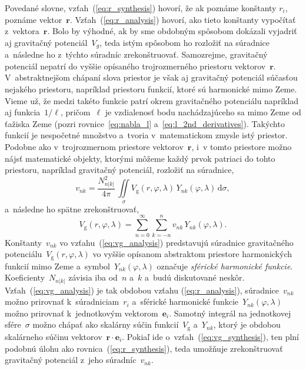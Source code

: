 \documentclass[a4paper, 12pt]{book}
\newcommand{\diff}{\mathrm d}
\newcommand{\gidx}{\mathrm g}
\let\vec\mathbf
\begin{document}
Povedané slovne, vzťah~(\ref{eq:r_synthesis}) hovorí, že ak poznáme konštanty 
$r_i$, poznáme vektor~$\vec r$.  Vzťah~(\ref{eq:r_analysis}) hovorí, ako tieto 
konštanty vypočítať z~vektora~$\vec r$.  Bolo by výhodné, ak by sme obdobným 
spôsobom dokázali vyjadriť aj gravitačný potenciál~$V_g$, teda istým spôsobom 
ho rozložiť na súradnice a~následne ho z~týchto súradníc zrekonštruovať.  
Samozrejme, gravitačný potenciál nepatrí do vyššie opísaného trojrozmerného 
priestoru vektorov~$\vec r$.  V~abstraktnejšom chápaní slova priestor je však 
aj gravitačný potenciál súčasťou nejakého priestoru, napríklad priestoru 
funkcií, ktoré sú harmonické mimo Zeme.  Vieme už, že medzi takéto funkcie 
patrí okrem gravitačného potenciálu napríklad aj funkcia~$1 \slash \ell$, 
pričom~$\ell$ je vzdialenosť bodu nachádzajúceho sa mimo Zeme od ťažiska Zeme 
(pozri rovnice~\ref{eq:nabla_l} a~\ref{eq:l_2nd_derivatives}).  Takýchto 
funkcií je nespočetné množstvo a~tvoria v~matematickom zmysle istý priestor.  
Podobne ako v~trojrozmernom priestore vektorov~$\vec r$, i~v tomto priestore 
možno nájsť matematické objekty, ktorými môžeme každý prvok patriaci do tohto 
priestoru, napríklad gravitačný potenciál, rozložiť na súradnice,
%
\begin{equation}
\label{eq:vg_analysis}
v_{nk} = \frac{N^2_{n|k|}}{4\pi} \, \iint\limits_{\sigma} V_\gidx(r, \varphi, 
\lambda) \, Y_{nk}(\varphi, \lambda) \, \diff \sigma{,}
\end{equation}
%
a~následne ho spätne zrekonštruovať,
%
\begin{equation}
\label{eq:vg_synthesis}
V_\gidx(r, \varphi, \lambda) = \sum_{n = 0}^{\infty} \sum_{k = -n}^{n} v_{nk}
\, Y_{nk}(\varphi, \lambda){.}
\end{equation}
%
Konštanty~$v_{nk}$ vo vzťahu~(\ref{eq:vg_analysis}) predstavujú súradnice
gravitačného potenciálu~$V_\gidx(r, \varphi, \lambda)$ vo vyššie opísanom
abstraktom priestore harmonických funkcií mimo Zeme a~symbol~$Y_{nk}(\varphi, 
\lambda)$
označuje \emph{sférické harmonické funkcie}.  Koeficienty~$N_{n|k|}$ závisia
iba od~$n$ a~$k$ a~budú diskutované neskôr.  Vzťah~(\ref{eq:vg_analysis}) je
tak obdobou vzťahu (\ref{eq:r_analysis}), súradnice~$v_{nk}$ možno prirovnať
k~súradniciam~$r_i$ a~sférické harmonické funkcie~$Y_{nk}(\varphi, \lambda)$
možno prirovnať k~jednotkovým vektorom~$\vec e_i$.  Samotný integrál na
jednotkovej sfére~$\sigma$ možno chápať ako skalárny súčin funkcií~$V_\gidx$
a~$Y_{nk}$, ktorý je obdobou skalárneho súčinu vektorov~$\vec r \cdot \vec
e_i$.  Pokiaľ ide o~vzťah~(\ref{eq:vg_synthesis}), ten plní podobnú úlohu ako
rovnica~(\ref{eq:r_synthesis}), teda umožňuje zrekonštruovať gravitačný
potenciál z~jeho súradníc~$v_{nk}$.
\end{document}
